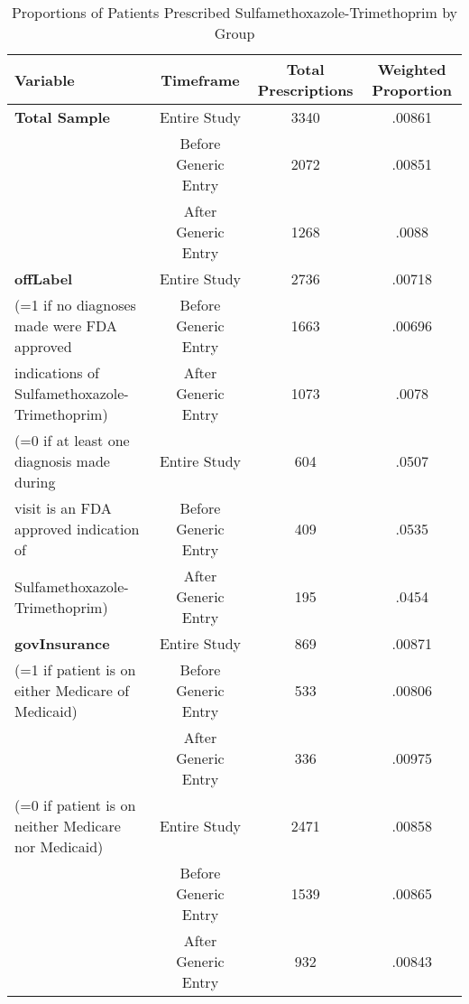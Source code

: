 \begin{table}[htbp]\centering
\def\sym#1{\ifmmode^{#1}\else\(^{#1}\)\fi}
\caption{Proportions of Patients Prescribed Sulfamethoxazole-Trimethoprim by Group\label{tab1}}
\begin{tabular}{l*{3}{c}}
\hline\hline
            Variable&\multicolumn{1}{c}{Timeframe}&\multicolumn{1}{c}{Total Prescriptions}&\multicolumn{1}{c}{Weighted Proportion}\\
\hline
\textbf{Total Sample}                                   &     Entire Study&             3340&     .00861\\
                                                        &     Before Generic Entry&    2072&     .00851\\
                                                        &     After Generic Entry&      1268&     .0088\\
[1em]
\textbf{offLabel}                                       &     Entire Study&             2736&     .00718\\
(=1 if no diagnoses made were FDA approved         &     Before Generic Entry&    1663&     .00696\\
indications of Sulfamethoxazole-Trimethoprim)  &     After Generic Entry&      1073&     .0078\\
[1em]
(=0 if at least one diagnosis made during               &     Entire Study&             604&     .0507\\
visit is an FDA approved indication of                  &     Before Generic Entry&    409&     .0535\\
Sulfamethoxazole-Trimethoprim)                          &     After Generic Entry&      195&     .0454\\
[1em]
\textbf{govInsurance}                                   &     Entire Study&             869&     .00871\\
(=1 if patient is on either Medicare of Medicaid)       &     Before Generic Entry&     533 &     .00806\\
                                                        &     After Generic Entry&      336 &     .00975\\
[1em]
(=0 if patient is on neither Medicare nor Medicaid)     &     Entire Study&             2471&     .00858\\
                                                        &     Before Generic Entry&     1539 &     .00865\\
                                                        &     After Generic Entry&      932 &     .00843\\

\end{tabular}
\end{table}
